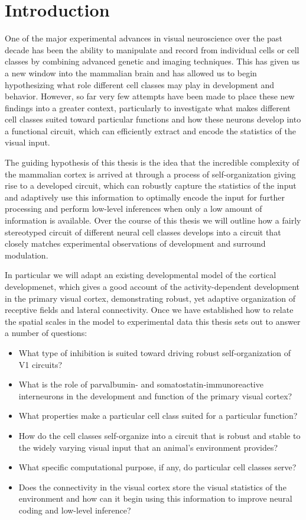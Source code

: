 \chapter{Introduction}

One of the major experimental advances in visual neuroscience over the
past decade has been the ability to manipulate and record from
individual cells or cell classes by combining advanced genetic and
imaging techniques. This has given us a new window into the mammalian
brain and has allowed us to begin hypothesizing what role different
cell classes may play in development and behavior. However, so far
very few attempts have been made to place these new findings into a
greater context, particularly to investigate what makes different cell
classes suited toward particular functions and how these neurons
develop into a functional circuit, which can efficiently extract and
encode the statistics of the visual input.

The guiding hypothesis of this thesis is the idea that the incredible
complexity of the mammalian cortex is arrived at through a process of
self-organization giving rise to a developed circuit, which can
robustly capture the statistics of the input and adaptively use this
information to optimally encode the input for further processing and
perform low-level inferences when only a low amount of information is
available. Over the course of this thesis we will outline how a fairly
stereotyped circuit of different neural cell classes develops into a
circuit that closely matches experimental observations of development
and surround modulation.

In particular we will adapt an existing developmental model of the
cortical developmenet, which gives a good account of the
activity-dependent development in the primary visual cortex,
demonstrating robust, yet adaptive organization of receptive fields
and lateral connectivity. Once we have established how to relate the
spatial scales in the model to experimental data this thesis sets out
to answer a number of questions:

\begin{itemize}
\item What type of inhibition is suited toward driving robust
  self-organization of V1 circuits?
\item What is the role of parvalbumin- and somatostatin-immunoreactive
  interneurons in the development and function of the primary visual
  cortex?
\item What properties make a particular cell class suited for a
  particular function?
\item How do the cell classes self-organize into a circuit that is
  robust and stable to the widely varying visual input that an
  animal's environment provides?
\item What specific computational purpose, if any, do particular cell
  classes serve?
\item Does the connectivity in the visual cortex store the visual
  statistics of the environment and how can it begin using this
  information to improve neural coding and low-level inference?
\end{itemize}

